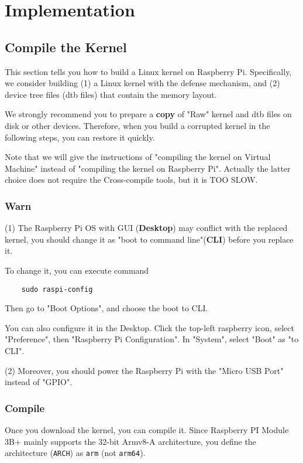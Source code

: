 \section{Implementation}
\label{sec:impl}


\subsection{Compile the Kernel}
This section tells you how to build a Linux kernel on Raspberry Pi. Specifically, we consider building (1) a Linux kernel with the defense mechanism, and (2) device tree files (dtb files) that contain the memory layout.

We strongly recommend you to prepare a \textbf{copy} of "Raw" kernel and dtb files on disk or other devices. Therefore, when you build a corrupted kernel in the following steps, you can restore it quickly.

Note that we will give the instructions of "compiling the kernel on Virtual Machine" instead of "compiling the kernel on Raspberry Pi". Actually the latter choice does not require the Cross-compile tools, but it is TOO SLOW.

\subsubsection{Warn}

(1) The Raspberry Pi OS with GUI (\textbf{Desktop}) may conflict with the replaced kernel, you should change it as "boot to command line"(\textbf{CLI}) before you replace it.

To change it, you can execute command 

\begin{lstlisting}
	sudo raspi-config
\end{lstlisting}

Then go to "Boot Options", and choose the boot to CLI.

You can also configure it in the Desktop. Click the top-left raspberry icon, select "Preference", then "Raspberry Pi Configuration". In "System", select "Boot" as "to CLI".

(2) Moreover, you should power the Raspberry Pi with the "Micro USB Port" instead of "GPIO".

\subsubsection{Compile}

Once you download the kernel, you can compile it.  Since Raspberry PI 
Module 3B+ mainly supports the 32-bit Armv8-A architecture, 
you define the architecture (\texttt{ARCH}) as \texttt{arm} (not 
\texttt{arm64}).

